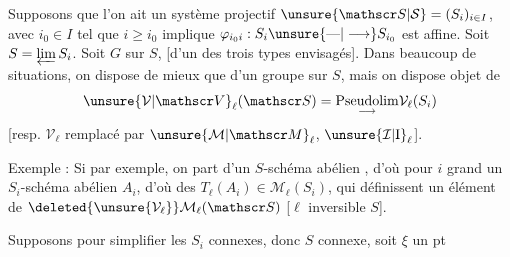 Supposons que l'on ait un système projectif $\unsure{\mathscr S|\mathcal S}=(S_i)_{i\in I}$, avec $i_0\in I$ tel que $i\geq i_0$ implique $\varphi_{i_0i}:S_i\unsure{\text{---}|\longrightarrow}S_{i_0}$ est affine. Soit $S=\varprojlim S_i$. Soit $G$ sur $S$, [d'un des trois types envisagés]. Dans beaucoup de situations, on dispose de mieux que d'un groupe sur $S$, mais on dispose  objet de
\[
\unsure{\mathcal V|\mathscr V}_\ell(\mathscr S)=\underset{\longrightarrow}{\operatorname{Pseudolim}}\mathcal V_\ell(S_i)
\]
[resp.  $\mathcal V_\ell$ remplacé par $\unsure{\mathcal M|\mathscr M}_\ell$, $\unsure{\mathcal I|\mathrm I}_\ell$].

Exemple : Si par exemple, on part d'un  $S$-schéma abélien , d'où pour $i$ grand un $S_i$-schéma abélien $A_i$, d'où des $T_\ell(A_i)\in\mathcal M_\ell(S_i)$, qui définissent un élément de $\deleted{\unsure{\mathcal V_\ell}}\mathcal M_\ell(\mathscr S)$ [$\ell$ inversible  $S$].

Supposons pour simplifier les $S_i$ connexes, donc $S$ connexe, soit $\xi$ un pt
